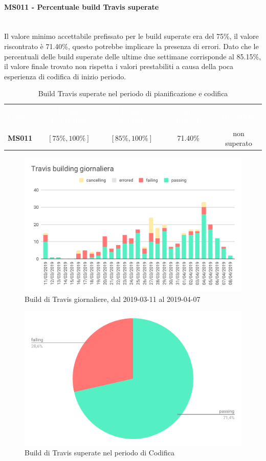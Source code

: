     \paragraph{MS011 - Percentuale build Travis superate }\mbox{}\\[0,3cm]
    Il valore minimo accettabile prefissato per le build superate era del 75\%, il valore riscontrato
    è 71.40\%, questo potrebbe implicare la presenza di errori. Dato che le percentuali delle
    build superate delle ultime due settimane corrisponde al 85.15\%, il valore finale
    trovato non rispetta i valori prestabiliti a causa della poca esperienza di codifica di inizio periodo.
    \begin{table}[H]
        \centering
        \begin{tabular}{c c c c c}
        \rowcolor{greySWEight}
        \textcolor{white}{\textbf{Codice}} &
        \textcolor{white}{\textbf{Range accettabile}} &
        \textcolor{white}{\textbf{Range ottimale}} &
        \textcolor{white}{\textbf{build superate}} &
        \textcolor{white}{\textbf{Riscontro}}\\
        \textbf{MS011} & $[75\%,100\%]$ & $[85\%,100\%]$ & 71.40\% & \textcolor{RubineRed}{non superato} \\
    
        \end{tabular}
        \caption{Build Travis superate nel periodo di pianificazione e codifica}
    \end{table}
    \begin{figure}[H]
        \centering
        \includegraphics[width=0.7\linewidth]{sez/App_Esito/Qualifica/graph/buildTravisGiornaliera.pdf}
        \caption{Build di Travis giornaliere, dal 2019-03-11 al 2019-04-07}
    \end{figure}
    \begin{figure}[H]
        \centering
        \includegraphics[width=0.7\linewidth]{sez/App_Esito/Qualifica/graph/buildTravisSuperate.pdf}
        \caption{Build di Travis superate nel periodo di Codifica}
    \end{figure}